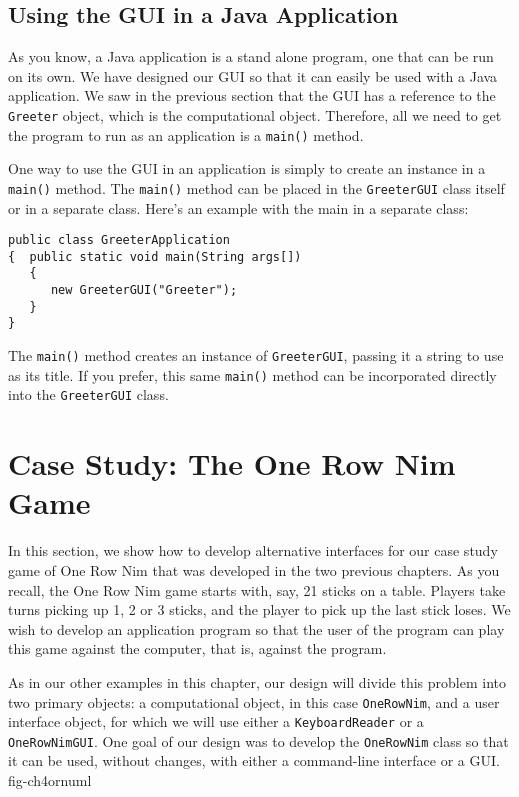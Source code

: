 \subsection{Using the GUI in a Java Application}

As you know, a Java application is a stand alone program, one that can
be run on its own.  We have designed our GUI so that it can easily be
used with a Java application. We saw in the previous section that the
GUI has a reference to the {\tt Greeter} object, which is the
computational object. Therefore, all we need to get the program to run
as an application is a {\tt main()} method.

One way to use the GUI in an application is simply to create an instance
in a {\tt main()} method. The {\tt main()} method can be placed in the
{\tt GreeterGUI} class itself or in a separate class. Here's an example
with the main in a separate class:

\begin{jjjlisting}
\begin{lstlisting}
public class GreeterApplication 
{  public static void main(String args[]) 
   {  
      new GreeterGUI("Greeter");	
   }
}
\end{lstlisting}
\end{jjjlisting}

\noindent The {\tt main()} method creates an instance of 
{\tt GreeterGUI}, passing it a string to use as its title.  If you
prefer, this same {\tt main()} method can be incorporated directly
into the {\tt GreeterGUI} class.


\section{Case Study: The One Row Nim Game }

In this section, we show how to develop alternative interfaces for our
case study game of One Row Nim that was developed in the two previous
chapters. As you recall, the One Row Nim game starts with, say, 21
sticks on a table. Players take turns picking up 1, 2 or 3 sticks,
and the player to pick up the last stick loses.  We wish to 
develop an application program so that the user of the program
can play this game against the computer, that is, against the program. 

As in our other examples in this chapter, our design will divide this
problem into two primary objects: a computational object, in this case
{\tt OneRowNim}, and a user interface object, for which we will
use either a {\tt KeyboardReader} or a {\tt OneRowNimGUI}. One goal of
our design was to develop the {\tt OneRowNim} class so that it can be
used, without changes, with either a command-line interface or a GUI.
{fig-ch4ornuml}

